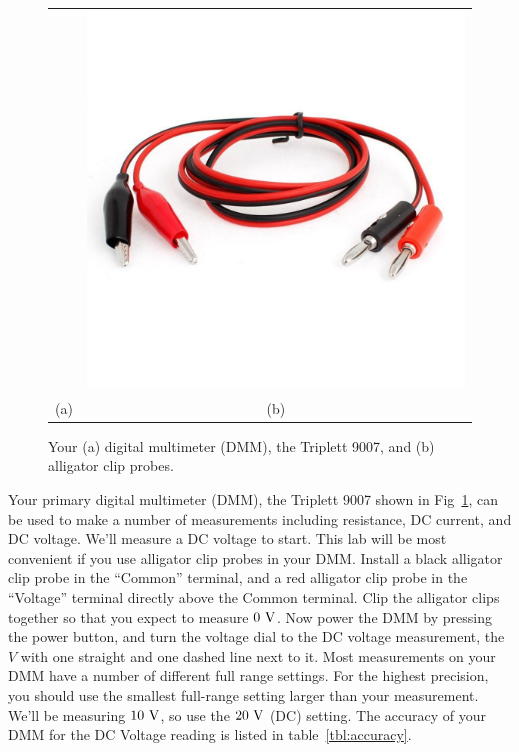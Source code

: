 \begin{figure}[htbp]
\begin{center}
\begin{tabular}{cc}
\begin{tikzpicture}
\end{tikzpicture}&
\includegraphics[height=0.2\textheight]{figs/labs/dc_circuits/alligator.jpg}
\\
(a) & (b) \\
\end{tabular}
\caption{Your (a) digital multimeter (DMM), the Triplett 9007, and (b) alligator clip probes.}
\label{fig:triplett}
\end{center}
\end{figure}

Your primary digital multimeter (DMM), the Triplett 9007 shown in Fig~\ref{fig:triplett}, can be used to make a number of measurements
including resistance, DC current, and DC voltage.  We'll measure a DC voltage to start.  This lab will be most convenient if you use
alligator clip probes in your DMM.  Install a black alligator clip probe in the ``Common'' terminal, and a red alligator clip probe in
the ``Voltage'' terminal directly above the Common terminal.  Clip the alligator clips together so that you expect to measure $0~\rm V$.  Now
power the DMM by pressing the power button, and turn the voltage dial to the DC voltage measurement, the $V$ with one straight and one
dashed line next to it.  Most measurements on your DMM have a number of different full range settings.  For the highest precision, you
should use the smallest full-range setting larger than your measurement.  We'll be measuring $10~\rm V$, so use the $20~\rm V$
(DC) setting. The accuracy of your DMM for the DC Voltage reading is listed in table~\ref{tbl:accuracy}. 


